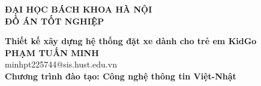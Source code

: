 \documentclass[DoAn.tex]{subfiles}
\begin{document}
\begin{titlepage}
  \thispagestyle{empty}
  \begin{center}

    {\textbf{\large{ĐẠI HỌC BÁCH KHOA HÀ NỘI}}}\\[4cm]

    {\textbf{\huge{ ĐỒ ÁN TỐT NGHIỆP}}}\\[1cm]
    {\textbf{\Large{Thiết kế xây dựng hệ thống đặt xe dành cho trẻ em KidGo}}\\[1cm]

      {\textbf{\large{PHẠM TUẤN MINH}}}\\
      {\large{minhpt225744@sis.hust.edu.vn}}\\[0.5cm]

      {\textbf{\large{Chương trình đào tạo: Công nghệ thông tin Việt-Nhật
          }}}\\

      \vspace{4cm}
      \begin{table}[H]
        \centering
      \end{table}}
  \end{center}



\end{titlepage}
\end{document}
